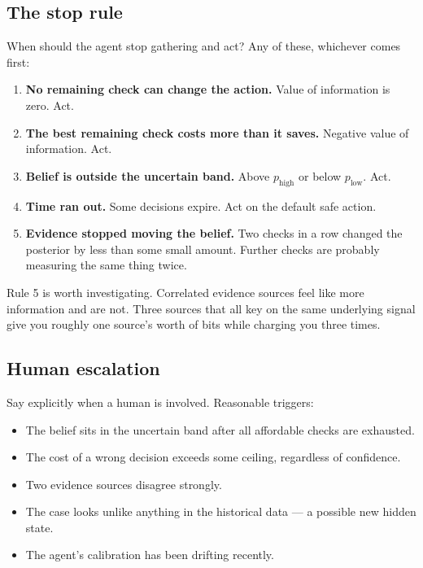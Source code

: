 \documentclass[11pt,a4paper]{article}
\begin{document}
\subsection{The stop rule}

When should the agent stop gathering and act? Any of these, whichever comes first:

\begin{enumerate}
  \item \textbf{No remaining check can change the action.} Value of information is zero. Act.
  \item \textbf{The best remaining check costs more than it saves.} Negative value of information. Act.
  \item \textbf{Belief is outside the uncertain band.} Above $p_{\text{high}}$ or below $p_{\text{low}}$. Act.
  \item \textbf{Time ran out.} Some decisions expire. Act on the default safe action.
  \item \textbf{Evidence stopped moving the belief.} Two checks in a row changed the posterior by
        less than some small amount. Further checks are probably measuring the same thing twice.
\end{enumerate}

Rule 5 is worth investigating. Correlated evidence sources feel like more information and are
not. Three sources that all key on the same underlying signal give you roughly one source's
worth of bits while charging you three times.

\subsection{Human escalation}

Say explicitly when a human is involved. Reasonable triggers:

\begin{itemize}
  \item The belief sits in the uncertain band after all affordable checks are exhausted.
  \item The cost of a wrong decision exceeds some ceiling, regardless of confidence.
  \item Two evidence sources disagree strongly.
  \item The case looks unlike anything in the historical data --- a possible new hidden state.
  \item The agent's calibration has been drifting recently.
\end{itemize}
\end{document}
